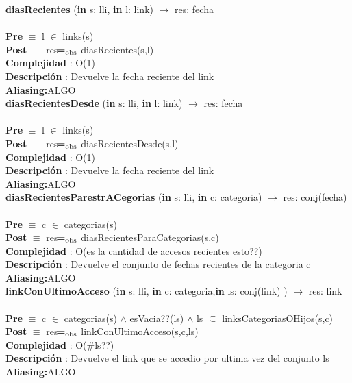 \documentclass[10pt, a4paper]{article}
\begin{document}
	\textbf{diasRecientes} (\textbf{in} s: lli, \textbf{in} l: link) $\longrightarrow$ res: fecha\\\\
	\textbf{Pre} $\equiv$ {l $\in$ links(s)}\\
	\textbf{Post} $\equiv$ {res$=_{\mathrm{obs}}$ diasRecientes(s,l)}\\
	\textbf{Complejidad} : O(1)\\
	\textbf{Descripci\'{o}n} : Devuelve la fecha reciente del link\\
	\textbf{Aliasing:}ALGO \\
	
	\textbf{diasRecientesDesde} (\textbf{in} s: lli, \textbf{in} l: link) $\longrightarrow$ res: fecha\\\\
	\textbf{Pre} $\equiv$ {l $\in$ links(s)}\\
	\textbf{Post} $\equiv$ {res$=_{\mathrm{obs}}$ diasRecientesDesde(s,l)}\\
	\textbf{Complejidad} : O(1)\\
	\textbf{Descripci\'{o}n} : Devuelve la fecha reciente del link\\
	\textbf{Aliasing:}ALGO \\
	
	\textbf{diasRecientesParestrACegorias} (\textbf{in} s: lli, \textbf{in} c: categoria) $\longrightarrow$ res: conj(fecha)\\\\
	\textbf{Pre} $\equiv$ {c $\in$ categorias(s)}\\
	\textbf{Post} $\equiv$ {res$=_{\mathrm{obs}}$ diasRecientesParaCategorias(s,c)}\\
	\textbf{Complejidad} : O(es la cantidad de accesos recientes esto??)\\
	\textbf{Descripci\'{o}n} : Devuelve el conjunto de fechas recientes de la categoria c\\
	\textbf{Aliasing:}ALGO \\
	
	\textbf{linkConUltimoAcceso} (\textbf{in} s: lli, \textbf{in} c: categoria,\textbf{in} ls: conj(link) ) $\longrightarrow$ res: link\\\\
	\textbf{Pre} $\equiv$ {c $\in$ categorias(s) $\wedge$ esVacia??(ls) $\wedge$ ls $\subseteq$ linksCategoriasOHijos(s,c)}\\
	\textbf{Post} $\equiv$ {res$=_{\mathrm{obs}}$ linkConUltimoAcceso(s,c,ls)}\\
	\textbf{Complejidad} : O($\#$ls??)\\
	\textbf{Descripci\'{o}n} : Devuelve el link que se accedio por ultima vez del conjunto ls\\
	\textbf{Aliasing:}ALGO \\
	
\end{document}
